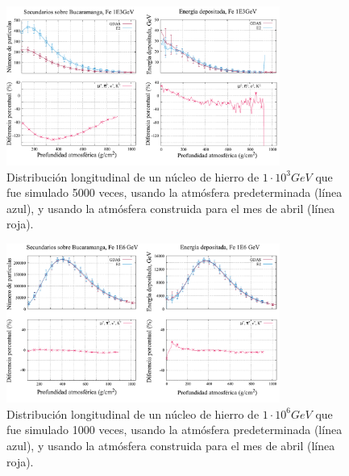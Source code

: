 \begin{figure}[htb!]
\centering
\includegraphics[width=0.8\textwidth]{Figs/fe_1E3.pdf}
\caption[Distribución longitudinal de un núcleo de hierro de $1\cdot 10^{3}$ GeV.]{Distribución longitudinal de un núcleo de hierro de $1\cdot 10^{3} GeV$ que fue simulado 5000 veces, usando la atmósfera predeterminada (línea azul), y usando la atmósfera construida para el mes de abril (línea roja). }
\label{fig:fig27}
\end{figure}

\begin{figure}[htb!]
\centering
\includegraphics[width=0.8\textwidth]{Figs/fe_1E6.pdf}
\caption[Distribución longitudinal de un núcleo de hierro de $1\cdot 10^{6}$ GeV.]{Distribución longitudinal de un núcleo de hierro de $1\cdot 10^{6} GeV$ que fue simulado 1000 veces, usando la atmósfera predeterminada (línea azul), y usando la atmósfera construida para el mes de abril (línea roja). }
\label{fig:fig28}
\end{figure}

